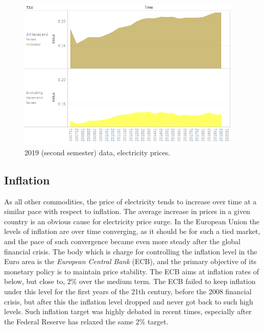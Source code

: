 \documentclass[a4paper,12pt]{book}
\begin{document}
\begin{figure}[tb]
\begin{center}
\captionsetup{justification=centering}
\includegraphics[width=0.95\textwidth]{Images/TaxesTime.png}
\caption{2019 (second semester) data, electricity prices. }
\label{fig:TaxesTime}
\end{center}
\end{figure}

\subsection{Inflation}

As all other commodities, the price of electricity tends to increase over time at a similar pace with respect to inflation. The average increase in prices in a given country is an obvious cause for electricity price surge. In the European Union the levels of inflation are over time converging, as it should be for such a tied market, and the pace of such convergence became even more steady after the global financial crisis. \cite{brovz2018dynamics} The body which is charge for controlling the inflation level in the Euro area is the \textit{European Central Bank} (ECB), and the primary objective of its monetary policy is to maintain price stability. The ECB aims at inflation rates of below, but close to, 2\% over the medium term. The ECB failed to keep inflation under this level for the first years of the 21th century, before the 2008 financial crisis, but after this the inflation level dropped and never got back to such high levels. Such inflation target was highly debated in recent times, especially after the Federal Reserve has relaxed the same 2\% target.
\end{document}
